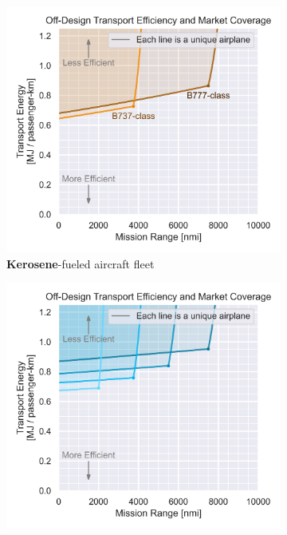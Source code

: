 \begin{figure}[h]
    \centering
    \begin{subfigure}[b]{0.49\textwidth}
        \includegraphics[width=\textwidth]{../figures/Hydrogen/ppt/media/image32.png}
        \caption{\textbf{Kerosene}-fueled aircraft fleet}
        \label{fig:design_space_h2}
    \end{subfigure}
    \begin{subfigure}[b]{0.49\textwidth}
        \includegraphics[width=\textwidth]{../figures/Hydrogen/ppt/media/image33.png}

\end{subfigure}
\end{figure}

